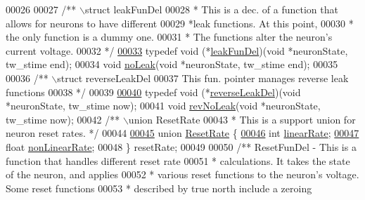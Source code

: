 \begin{DoxyCode}
00026 
00027 \textcolor{comment}{/** \(\backslash\)struct leakFunDel}
00028 \textcolor{comment}{ *  This is a dec. of a function that allows for neurons to have different}
00029 \textcolor{comment}{ *leak functions. At this point,}
00030 \textcolor{comment}{ *  the only function is a dummy one.}
00031 \textcolor{comment}{ *  The functions alter the neuron's current voltage.}
00032 \textcolor{comment}{ */}
\hypertarget{neuron_8h_source_l00033}{}\hyperlink{neuron_8h_a6eab2da39fb76cba9c4c54b5fb7625a6}{00033} \textcolor{keyword}{typedef} \textcolor{keywordtype}{void} (*\hyperlink{neuron_8h_a6eab2da39fb76cba9c4c54b5fb7625a6}{leakFunDel})(\textcolor{keywordtype}{void} *neuronState, tw\_stime end);
00034 \textcolor{keywordtype}{void} \hyperlink{neuron_8h_a6d548f86a3f6618241b7ffc5dd3ad374}{noLeak}(\textcolor{keywordtype}{void} *neuronState, tw\_stime end);
00035 
00036 \textcolor{comment}{/** \(\backslash\)struct reverseLeakDel}
00037 \textcolor{comment}{ This fun. pointer manages reverse leak functions}
00038 \textcolor{comment}{ */}
00039 
\hypertarget{neuron_8h_source_l00040}{}\hyperlink{neuron_8h_a960bf554f8c5333d901a15c49066f5b6}{00040} \textcolor{keyword}{typedef} \textcolor{keywordtype}{void} (*\hyperlink{neuron_8h_a960bf554f8c5333d901a15c49066f5b6}{reverseLeakDel})(\textcolor{keywordtype}{void} *neuronState, tw\_stime now);
00041 \textcolor{keywordtype}{void} \hyperlink{neuron_8h_a23e8b1105b7db3282e2b362edbb98f5a}{revNoLeak}(\textcolor{keywordtype}{void} *neuronState, tw\_stime now);
00042 \textcolor{comment}{/** \(\backslash\)union ResetRate}
00043 \textcolor{comment}{ *  This is a support union for neuron reset rates. */}
00044 
\hypertarget{neuron_8h_source_l00045}{}\hyperlink{union_reset_rate}{00045} \textcolor{keyword}{union} \hyperlink{union_reset_rate}{ResetRate} \{
\hypertarget{neuron_8h_source_l00046}{}\hyperlink{union_reset_rate_a4bf8a23e4a9874ff73208c681eae1ced}{00046}     \textcolor{keywordtype}{int} \hyperlink{union_reset_rate_a4bf8a23e4a9874ff73208c681eae1ced}{linearRate};
\hypertarget{neuron_8h_source_l00047}{}\hyperlink{union_reset_rate_a54aaba14ce85fd9c5d7b385d98727e36}{00047}     \textcolor{keywordtype}{float} \hyperlink{union_reset_rate_a54aaba14ce85fd9c5d7b385d98727e36}{nonLinearRate};
00048 \} resetRate;
00049 
00050 \textcolor{comment}{/** ResetFunDel - This is a function that handles different reset rate}
00051 \textcolor{comment}{ * calculations. It takes the state of the neuron, and applies}
00052 \textcolor{comment}{ *  various reset functions to the neuron's voltage. Some reset functions}
00053 \textcolor{comment}{ * described by true north include a zeroing}

\end{DoxyCode}
